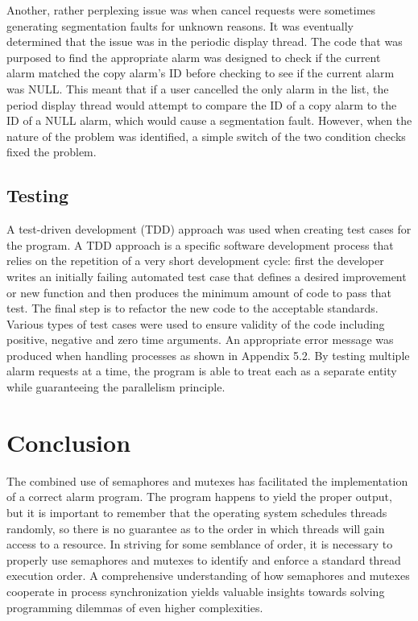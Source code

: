\documentclass[11pt]{article}
\newcommand{\forceindent}{\leavevmode{\parindent=1em\indent}}
\begin{document}
	Another, rather perplexing issue was when cancel requests were sometimes generating segmentation faults for unknown reasons. It was eventually determined that the issue was in the periodic display thread. The code that was purposed to find the appropriate alarm was designed to check if the current alarm matched the copy alarm’s ID before checking to see if the current alarm was NULL. This meant that if a user cancelled the only alarm in the list, the period display thread would attempt to compare the ID of a copy alarm to the ID of a NULL alarm, which would cause a segmentation fault. However, when the nature of the problem was identified, a simple switch of the two condition checks fixed the problem.
	
\subsection{Testing}

\forceindent A test-driven development (TDD) approach was used when creating test cases for the program. A TDD approach is a specific software development process that relies on the repetition of a very short development cycle: first the developer writes an initially failing automated test case that defines a desired improvement or new function and then produces the minimum amount of code to pass that test. The final step is to refactor the new code to the acceptable standards.\\

Various types of test cases were used to ensure validity of the code including positive, negative and zero time arguments. An appropriate error message was produced when handling processes as shown in Appendix 5.2. By testing multiple alarm requests at a time, the program is able to treat each as a separate entity while guaranteeing the parallelism principle. 

\section{Conclusion}

\forceindent The combined use of semaphores and mutexes has facilitated the implementation of a correct alarm program. The program happens to yield the proper output, but it is important to remember that the operating system schedules threads randomly, so there is no guarantee as to the order in which threads will gain access to a resource. In striving for some semblance of order, it is necessary to properly use semaphores and mutexes to identify and enforce a standard thread execution order. A comprehensive understanding of how semaphores and mutexes cooperate in process synchronization yields valuable insights towards solving programming dilemmas of even higher complexities. 
\end{document}
